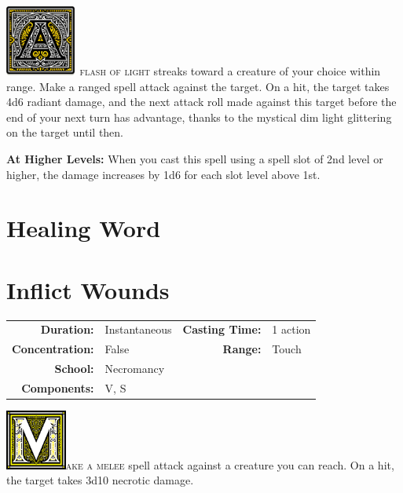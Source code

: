 \documentclass[12pt,showtrims]{memoir}
\begin{document}
\vspace{1\baselineskip}\noindent
\lettrine[lines=4]{\includegraphics[height=66pt]{initials/A.png}}{\ flash of light} streaks toward a creature of your choice within range. Make a ranged spell attack against the target. On a hit, the target takes 4d6 radiant damage, and the next attack roll made against this target before the end of your next turn has advantage, thanks to the mystical dim light glittering on the target until then.

\vspace{8pt} \noindent\textbf{At Higher Levels:} When you cast this spell using a spell slot of 2nd level or higher, the damage increases by 1d6 for each slot level above 1st.
\newpage
{}
\newpage
\section*{Healing Word}
\newpage
\section*{Inflict Wounds}

{
\small\centering\vspace{-6pt}
\begin{tabular}{rlrl}
\toprule

\textbf{Duration:} & Instantaneous &
\textbf{Casting Time:} & 1 action \\
\textbf{Concentration:} & False &
\textbf{Range:} & Touch \\
\textbf{School:} & Necromancy \\
\textbf{Components:} & \multicolumn{3}{p{0.7\textwidth}}{V, S}\\

\bottomrule
\end{tabular}
}

\vspace{1\baselineskip}\noindent
\lettrine[lines=4]{\includegraphics[height=56pt]{initials/M.png}}{ake a melee} spell attack against a creature you can reach. On a hit, the target takes 3d10 necrotic damage.
\end{document}
